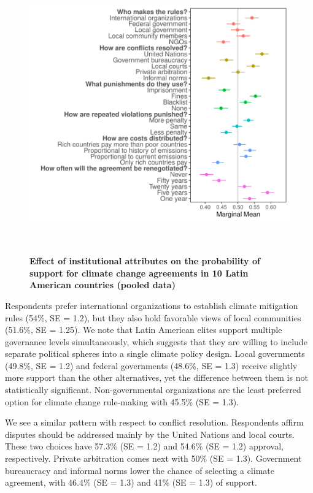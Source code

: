 \documentclass[a4paper,12pt]{article}
\begin{document}
\begin{figure}[H]
	\centering
	\includegraphics[height=12cm]{MM_all.pdf}
	\caption{\textbf{Effect of institutional attributes on the probability of support for climate change agreements in 10 Latin American countries (pooled data)}}
	\label{fig:pooled}
\end{figure}

Respondents prefer international organizations to establish climate mitigation rules (54\%, SE = 1.2), but they also hold favorable views of local communities (51.6\%, SE = 1.25). We note that Latin American elites support multiple governance levels simultaneously, which suggests that they are willing to include separate political spheres into a single climate policy design.  Local governments (49.8\%, SE = 1.2) and federal governments (48.6\%, SE = 1.3) receive slightly more support than the other alternatives, yet the difference between them is not statistically significant. Non-governmental organizations are the least preferred option for climate change rule-making with 45.5\% (SE = 1.3).

We see a similar pattern with respect to conflict resolution. Respondents affirm disputes should be addressed mainly by the United Nations and local courts. These two choices have 57.3\% (SE = 1.2) and 54.6\% (SE = 1.2) approval, respectively. Private arbitration comes next with 50\% (SE = 1.3). Government bureaucracy and informal norms lower the chance of selecting a climate agreement, with 46.4\% (SE = 1.3) and 41\% (SE = 1.3) of support.
\end{document}
